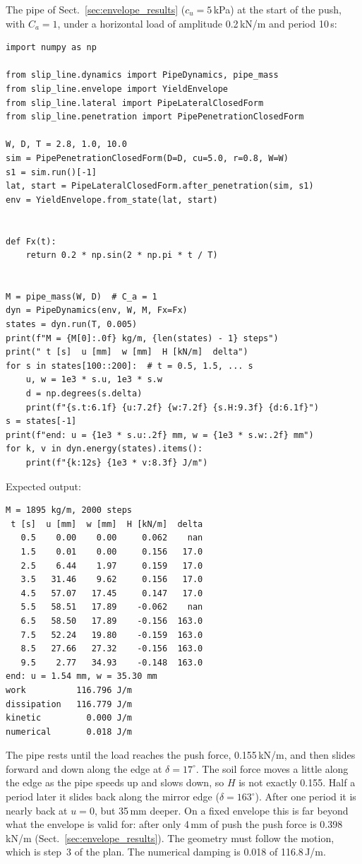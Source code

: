 \documentclass[11pt,a4paper]{article}
\begin{document}
The pipe of Sect.~\ref{sec:envelope_results} ($c_u = 5$\,kPa) at the
start of the push, with $C_a = 1$, under a horizontal load of amplitude
0.2\,kN/m and period 10\,s:
\begin{lstlisting}
import numpy as np

from slip_line.dynamics import PipeDynamics, pipe_mass
from slip_line.envelope import YieldEnvelope
from slip_line.lateral import PipeLateralClosedForm
from slip_line.penetration import PipePenetrationClosedForm

W, D, T = 2.8, 1.0, 10.0
sim = PipePenetrationClosedForm(D=D, cu=5.0, r=0.8, W=W)
s1 = sim.run()[-1]
lat, start = PipeLateralClosedForm.after_penetration(sim, s1)
env = YieldEnvelope.from_state(lat, start)


def Fx(t):
    return 0.2 * np.sin(2 * np.pi * t / T)


M = pipe_mass(W, D)  # C_a = 1
dyn = PipeDynamics(env, W, M, Fx=Fx)
states = dyn.run(T, 0.005)
print(f"M = {M[0]:.0f} kg/m, {len(states) - 1} steps")
print(" t [s]  u [mm]  w [mm]  H [kN/m]  delta")
for s in states[100::200]:  # t = 0.5, 1.5, ... s
    u, w = 1e3 * s.u, 1e3 * s.w
    d = np.degrees(s.delta)
    print(f"{s.t:6.1f} {u:7.2f} {w:7.2f} {s.H:9.3f} {d:6.1f}")
s = states[-1]
print(f"end: u = {1e3 * s.u:.2f} mm, w = {1e3 * s.w:.2f} mm")
for k, v in dyn.energy(states).items():
    print(f"{k:12s} {1e3 * v:8.3f} J/m")
\end{lstlisting}

Expected output:
\begin{lstlisting}[numbers=none]
M = 1895 kg/m, 2000 steps
 t [s]  u [mm]  w [mm]  H [kN/m]  delta
   0.5    0.00    0.00     0.062    nan
   1.5    0.01    0.00     0.156   17.0
   2.5    6.44    1.97     0.159   17.0
   3.5   31.46    9.62     0.156   17.0
   4.5   57.07   17.45     0.147   17.0
   5.5   58.51   17.89    -0.062    nan
   6.5   58.50   17.89    -0.156  163.0
   7.5   52.24   19.80    -0.159  163.0
   8.5   27.66   27.32    -0.156  163.0
   9.5    2.77   34.93    -0.148  163.0
end: u = 1.54 mm, w = 35.30 mm
work          116.796 J/m
dissipation   116.779 J/m
kinetic         0.000 J/m
numerical       0.018 J/m
\end{lstlisting}

The pipe rests until the load reaches the push force, 0.155\,kN/m, and
then slides forward and down along the edge at $\delta = 17^\circ$.
The soil force moves a little along the edge as the pipe speeds up and
slows down, so $H$ is not exactly 0.155.  Half a period later it slides
back along the mirror edge ($\delta = 163^\circ$).  After one period it
is nearly back at $u = 0$, but 35\,mm deeper.  On a fixed envelope this
is far beyond what the envelope is valid for: after only 4\,mm of push
the push force is 0.398\,kN/m (Sect.~\ref{sec:envelope_results}).  The
geometry must follow the motion, which is step~3 of the plan.  The
numerical damping is 0.018 of 116.8\,J/m.
\end{document}
